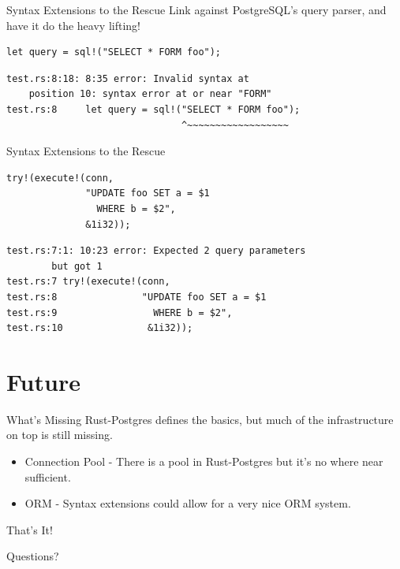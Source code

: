 \documentclass{beamer}
\begin{document}
\begin{frame}[fragile]{Syntax Extensions to the Rescue}
    Link against PostgreSQL's query parser, and have it do the heavy lifting!
    \begin{verbatim}
let query = sql!("SELECT * FORM foo");
    \end{verbatim}
    \begin{verbatim}
test.rs:8:18: 8:35 error: Invalid syntax at
    position 10: syntax error at or near "FORM"
test.rs:8     let query = sql!("SELECT * FORM foo");
                               ^~~~~~~~~~~~~~~~~~~
    \end{verbatim}
\end{frame}

\begin{frame}[fragile]{Syntax Extensions to the Rescue}
    \begin{verbatim}
try!(execute!(conn,
              "UPDATE foo SET a = $1
                WHERE b = $2",
              &1i32));
    \end{verbatim}
    \begin{verbatim}
test.rs:7:1: 10:23 error: Expected 2 query parameters
        but got 1
test.rs:7 try!(execute!(conn,
test.rs:8               "UPDATE foo SET a = $1
test.rs:9                 WHERE b = $2",
test.rs:10               &1i32));
    \end{verbatim}
\end{frame}

\section{Future}

\begin{frame}{What's Missing}
    Rust-Postgres defines the basics, but much of the infrastructure on top
    is still missing.
    \begin{itemize}
        \item Connection Pool - There is a pool in Rust-Postgres but it's no
        where near sufficient.
        \item ORM - Syntax extensions could allow for a very nice ORM system.
    \end{itemize}
\end{frame}

\begin{frame}{That's It!}
    \begin{center}
        Questions?
    \end{center}
\end{frame}
\end{document}
